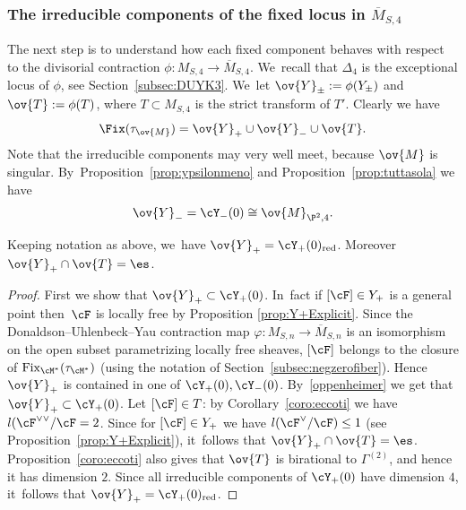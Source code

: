 \subsubsection*{The irreducible components of the fixed locus in $\overline{M}_{S,4}$}
The next step is to understand how each fixed component behaves with respect to the divisorial contraction $\phi\colon M_{S,4}\to \overline{M}_{S,4}$. We~recall that $\Delta_4$ is the exceptional locus of $\phi$, see Section~\ref{subsec:DUYK3}. We~let $\ov{Y}_{\pm}:=\phi(Y_{\pm})$ and $\ov{T}:=\phi(T)$, where $T\subset M_{S,4}$ is the strict transform of $T'$.
Clearly we have
\begin{equation*}
\Fix(\tau_{\ov{M}})=\ov{Y}_{+}\cup \ov{Y}_{-}\cup\ov{T}.
\end{equation*}
Note that the irreducible components may very well meet, because $\ov{M}$ is singular. By~Proposition~\ref{prop:ypsilonmeno} and Proposition~\ref{prop:tuttasola}
we have
\begin{equation}\label{oppenheimer}
\ov{Y}_{-}=\cY_{-}(0)\cong \ov{M}_{\P^2,4}.
\end{equation}

\begin{prop}\label{prp:bobbysolo}
Keeping notation as above, we~have $\ov{Y}_{+}=\cY_{+}(0)_\mathrm{
red}$. Moreover
$\ov{Y}_{+}\cap\ov{T}=\es$.
\end{prop}

\begin{proof}
First we show that $\ov{Y}_{+}\subset\cY_{+}(0)$. In~fact if $[\cF]\in Y_{+}$ is a general point then~$\cF$ is locally free by Proposition \ref{prop:Y+Explicit}. Since the Donaldson--Uhlenbeck--Yau contraction map $\varphi\colon M_{S,n}\to \overline{M}_{S,n}$ is an isomorphism on the open subset parametrizing locally free sheaves, $[\cF]$ belongs to the closure of $\mathrm{Fix}_{\cM^*}(\tau_{\cM^*})$ (using the notation of Section~\ref{subsec:negzerofiber}). Hence $\ov{Y}_{+}$ is contained in one of $\cY_{+}(0),\cY_{-}(0)$. By~\eqref{oppenheimer} we get that $\ov{Y}_{+}\subset\cY_{+}(0)$. Let $[\cF]\in T$: by Corollary~\ref{coro:eccoti}
we have $l(\cF^{\vee\vee}/\cF=2$. Since for $[\cF]\in Y_{+}$ we have $l(\cF^{\vee}/\cF)\le 1$ (see Proposition~\ref{prop:Y+Explicit}), it~follows that
$\ov{Y}_{+}\cap\ov{T}=\es$.
Proposition~\ref{coro:eccoti} also gives that $\ov{T}$ is birational to $\mathsf{\Gamma}^{(2)}$, and hence it has dimension $2$.
Since all irreducible components of $\cY_{+}(0)$ have dimension $4$, it~follows that $\ov{Y}_{+}=\cY_{+}(0)_\mathrm{red}$.
\end{proof}

